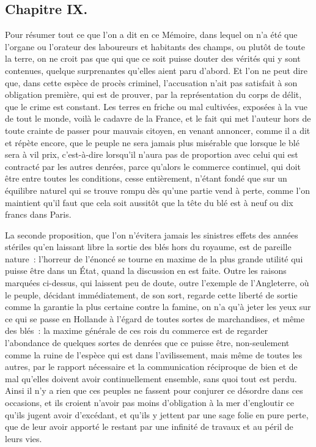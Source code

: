 \documentclass[french,twoside]{book} %
\begin{document}
\subsection[{Chapitre IX.}]{Chapitre IX.}
\noindent Pour résumer tout ce que l’on a dit en ce Mémoire, dans lequel on n’a été que l’organe ou l’orateur des laboureurs et habitants des champs, ou plutôt de toute la terre, on ne croit pas que qui que ce soit puisse douter des vérités qui y sont contenues, quelque surprenantes qu’elles aient paru d’abord. Et l’on ne peut dire que, dans cette espèce de procès criminel, l’accusation n’ait pas satisfait à son obligation première, qui est de prouver, par la représentation du corps de délit, que le crime est constant. Les terres en friche ou mal cultivées, exposées à la vue de tout le monde, voilà le cadavre de la France, et le fait qui met l’auteur hors de toute crainte de passer pour mauvais citoyen, en venant annoncer, comme il a dit et répète encore, que le peuple ne sera jamais plus misérable que lorsque le blé sera à vil prix, c’est-à-dire lorsqu’il n’aura pas de proportion avec celui qui est contracté par les autres denrées, parce qu’alors le commerce continuel, qui doit être entre toutes les conditions, cesse entièrement, n’étant fondé que sur un équilibre naturel qui se trouve rompu dès qu’une partie vend à perte, comme l’on maintient qu’il faut que cela soit aussitôt que la tête du blé est à neuf ou dix francs dans Paris.\par
La seconde proposition, que l’on n’évitera jamais les sinistres effets des années stériles qu’en laissant libre la sortie des blés hors du royaume, est de pareille nature : l’horreur de l’énoncé se tourne en maxime de la plus grande utilité qui puisse être dans un État, quand la discussion en est faite. Outre les raisons marquées ci-dessus, qui laissent peu de doute, outre l’exemple de l’Angleterre, où le peuple, décidant immédiatement, de son sort, regarde cette liberté de sortie comme la garantie la plus certaine contre la famine, on n’a qu’à jeter les yeux sur ce qui se passe en Hollande à l’égard de toutes sortes de marchandises, et même des blés : la maxime générale de ces rois du commerce est de regarder l’abondance de quelques sortes de denrées que ce puisse être, non-seulement comme la ruine de l’espèce qui est dans l’avilissement, mais même de toutes les autres, par le rapport nécessaire et la communication réciproque de bien et de mal qu’elles doivent avoir continuellement ensemble, sans quoi tout est perdu. Ainsi il n’y a rien que ces peuples ne fassent pour conjurer ce désordre dans ces occasions, et ils croient n’avoir pas moins d’obligation à la mer d’engloutir ce qu’ils jugent avoir d’excédant, et qu’ils y jettent par une sage folie en pure perte, que de leur avoir apporté le restant par une infinité de travaux et au péril de leurs vies.\par
\end{document}
